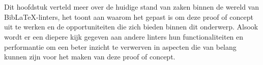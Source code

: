 \chapter{}%
\label{ch:stand-van-zaken}






Dit hoofdstuk verteld meer over de huidige stand van zaken binnen de wereld van BibLaTeX-linters, het toont aan waarom het gepast is om deze proof of concept uit te werken en de opportuniteiten die zich bieden binnen dit onderwerp. Alsook wordt er een diepere kijk gegeven aan andere linters hun functionaliteiten en performantie om een beter inzicht te verwerven in aspecten die van belang kunnen zijn voor het maken van deze proof of concept. 

